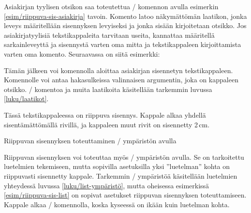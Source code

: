 \noindent
Asiakirjan tyylisen otsikon saa toteutettua \-/
komennon avulla esimerkin \ref{esim/riippuva-sis-asiakirja} tavoin.
Komento latoo näkymättömän laatikon, jonka leveys määritellään
sisennyksen levyiseksi ja jonka sisään kirjoitetaan otsikko. Jos
asiakirjatyylisiä tekstikappaleita tarvitaan useita, kannattaa
määritellä sarkainleveyttä ja sisennystä varten oma mitta ja
tekstikappaleen kirjoittamista varten oma komento. Seuraavassa on siitä
esimerkki:

\begin{koodilohkosis}
\newlength{\sarkain}
\setlength{\sarkain}{2.3cm}
\newcommand{\kappale}[1][]{\par\hangpara{2\sarkain}{1}%
  \makebox[2\sarkain][l]{\ignorespaces #1}\ignorespaces}
\end{koodilohkosis}

\noindent
Tämän jälkeen voi komennolla  aloittaa asiakirjan
sisennetyn tekstikappaleen. Komennolle voi antaa hakasulkeissa
valinnaisen argumentin, joka on kappaleen otsikko. \-/
komentoa ja muita laatikoita käsitellään tarkemmin luvussa
\ref{luku/laatikot}.

\begin{esimerkki*}
  \komentoi{,}

\begin{koodilohko}
\begin{list}{}{
    \setlength{\leftmargin}{2cm}
    \setlength{\itemindent}{-2cm}
  }
\item Tässä tekstikappaleessa on riippuva sisennys. Kappale alkaa
  yhdellä sisentämättömällä rivillä, ja kappaleen muut rivit on
  sisennetty 2\,cm.
\end{list}
\end{koodilohko}
  \caption{Riippuvan sisennyksen toteuttaminen \-/
    ympäristön avulla}
  \label{esim/riippuva-sis-list}
\end{esimerkki*}

Riippuvan sisennyksen voi toteuttaa myös \-/ ympäristön
avulla. Se on tarkoitettu luetelmien tekemiseen, mutta sopivilla
asetuksilla yksi ''luetelman'' kohta on riippuvasti sisennetty kappale.
Tarkemmin \-/ ympäristöä käsitellään luetelmien
yhteydessä luvussa \ref{luku/list-ympäristö}, mutta oheisessa
esimerkissä \ref{esim/riippuva-sis-list} on sopivat asetukset riippuvan
sisennyksen toteuttamiseen. Kappale alkaa \-/ komennolla,
koska kyseessä on ikään kuin luetelman kohta.

